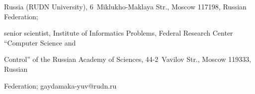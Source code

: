 Russia (RUDN University), 6~Miklukho-Maklaya Str., Moscow 117198, Russian Federation; 


senior scientist, Institute of Informatics Problems, Federal Research Center ``Computer Science and 


Control'' of the Russian Academy of Sciences, 44-2~Vavilov Str., Moscow 119333, Russian 


Federation; \mbox{gaydamaka-yuv@rudn.ru}





\label{end\stat}





\renewcommand{\bibname}{\protect\rm Литература} 



